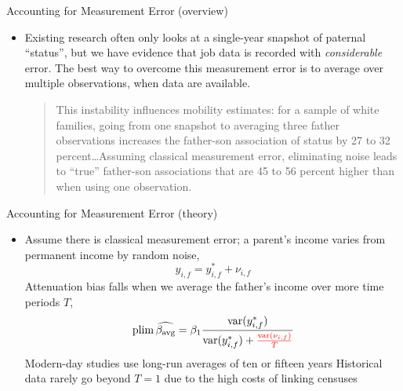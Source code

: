 \documentclass[dvipsnames]{beamer}
\newcommand{\var}{\operatorname{var}}
\begin{document}
%
\begin{frame}{Accounting for Measurement Error (overview)}
  \begin{itemize}
  \item Existing research often only looks at a single-year snapshot of paternal ``status'', but we have evidence that job data is recorded with \emph{considerable} error.
    \vitem The best way to overcome this measurement error is to average over multiple observations, when data are available.
    \vfill
    \begin{quote}
      This instability influences mobility estimates: for a sample of white families, going from one snapshot to averaging three father observations increases the father-son association of status by 27 to 32 percent\ldots Assuming classical measurement error, eliminating noise leads to ``true'' father-son associations that are 45 to 56 percent higher than when using one observation.
    \end{quote}
  \end{itemize}
\end{frame}
%
\begin{frame}{Accounting for Measurement Error (theory)}
  \begin{itemize}
  \item Assume there is classical measurement error; a parent's income varies from permanent income by random noise,
    \[y_{i, f} = y_{i, f}^\ast + \nu_{i, f}\]
    \vitem Attenuation bias falls when we average the father's income over more time periods $T$,
    \[
\operatorname{plim}\widehat{\beta_{\text{avg}}} = \beta_1 \frac{\var(y^\ast_{i, f})}{\var (y^\ast_{i, f}) + \rd{\frac{\var(\nu_{i, f})}{T}}}
    \]
    \vitem Modern-day studies use long-run averages of ten or fifteen years
    \vitem Historical data rarely go beyond $T = 1$ due to the high costs of linking censuses
  \end{itemize}
\end{frame}
%
\end{document}
